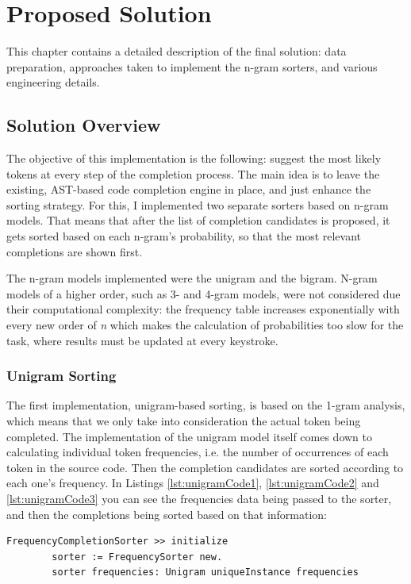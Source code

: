 \chapter{Proposed Solution}
\label{chap:ProposedSolution}

This chapter contains a detailed description of the final solution: data preparation, approaches taken to implement the n-gram sorters, and various engineering details.

\section{Solution Overview}
\label{sec:ProposedSolution-Overview}
The objective of this implementation is the following: suggest the most likely tokens at every step of the completion process. The main idea is to leave the existing, AST-based code completion engine in place, and just enhance the sorting strategy. For this, I implemented two separate sorters based on n-gram models. That means that after the list of completion candidates is proposed, it gets sorted based on each n-gram's probability, so that the most relevant completions are shown first.

The n-gram models implemented were the unigram and the bigram. N-gram models of a higher order, such as 3- and 4-gram models, were not considered due their computational complexity: the frequency table increases exponentially with every new order of \textit{n} which makes the calculation of probabilities too slow for the task, where results must be updated at every keystroke.

\subsection{Unigram Sorting}
The first implementation, unigram-based sorting, is based on the 1-gram analysis, which means that we only take into consideration the actual token being completed. The implementation of the unigram model itself comes down to calculating individual token frequencies, i.e. the number of occurrences of each token in the source code. Then the completion candidates are sorted according to each one's frequency. In Listings \ref{lst:unigramCode1}, \ref{lst:unigramCode2} and \ref{lst:unigramCode3}  you can see the frequencies data being passed to the sorter, and then the completions being sorted based on that information:

\begin{lstlisting}[caption={The unigram sorter implementation: passing the frequencies to the sorter}, label={lst:unigramCode1}]
    FrequencyCompletionSorter >> initialize
        sorter := FrequencySorter new.
        sorter frequencies: Unigram uniqueInstance frequencies
\end{lstlisting}

